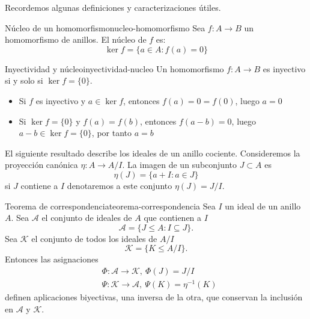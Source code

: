 Recordemos algunas definiciones y caracterizaciones útiles.

\begin{definition}{Núcleo de un homomorfismo}{nucleo-homomorfismo}
    Sea \(f: A \to B\) un homomorfismo de anillos. El {núcleo} de \(f\) es:
    \[
    \ker f = \{a \in A : f(a) = 0\}
    \]
\end{definition}

\begin{proposition}{Inyectividad y núcleo}{inyectividad-nucleo}
    Un homomorfismo \(f: A \to B\) es inyectivo si y solo si \(\ker f = \{0\}\).
\end{proposition}

\begin{proofbox}
    \begin{itemize}
        \item Si \(f\) es inyectivo y \(a \in \ker f\), entonces \(f(a) = 0 = f(0)\), luego \(a = 0\)
        \item Si \(\ker f = \{0\}\) y \(f(a) = f(b)\), entonces \(f(a - b) = 0\), luego \(a - b \in \ker f = \{0\}\), por tanto \(a = b\)
    \end{itemize}
\end{proofbox}

El siguiente resultado describe los ideales de un anillo cociente. Consideremos la proyección canónica $\eta : A \to A / I$. La imagen de un subconjunto $J \subset A$ es 
\[
\eta(J) = \{a + I : a \in J\}
\]
si $J$ contiene a $I$ denotaremos a este conjunto $\eta(J) = J/I$.

\begin{theorem}{Teorema de correspondencia}{teorema-correspondencia}
    Sea \(I\) un ideal de un anillo \(A\). Sea $\mathcal{A}$ el conjunto de ideales de \(A\) que contienen a \(I\)
    \[
    \mathcal{A} = \{J \leq A : I \subseteq J\}.
    \]
    Sea $\mathcal{K}$ el conjunto de todos los ideales de \(A/I\)
    \[
    \mathcal{K} = \{ K \leq A/I \}.
    \]
    Entonces las asignaciones
    \begin{align*}
    &\Phi : \mathcal{A} \to \mathcal{K},\ \Phi(J) = J/I \\
    &\Psi : \mathcal{K} \to \mathcal{A},\ \Psi(K) = \eta^{-1}(K)
    \end{align*}
    definen aplicaciones biyectivas, una inversa de la otra, que conservan la inclusión en $\mathcal{A}$ y $\mathcal{K}$.
\end{theorem}

